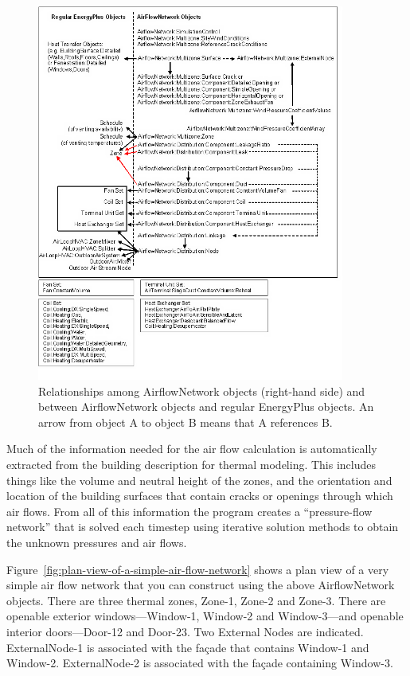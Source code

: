 \begin{figure}[hbtp] %
\centering
\includegraphics[width=0.9\textwidth, height=0.9\textheight, keepaspectratio=true]{media/image215.png}
\caption{Relationships among AirflowNetwork objects (right-hand side) and between AirflowNetwork objects and regular EnergyPlus objects. An arrow from object A to object B means that A references B. \protect \label{fig:relationships-among-airflownetwork-objects}}
\end{figure}

Much of the information needed for the air flow calculation is automatically extracted from the building description for thermal modeling. This includes things like the volume and neutral height of the zones, and the orientation and location of the building surfaces that contain cracks or openings through which air flows. From all of this information the program creates a ``pressure-flow network'' that is solved each timestep using iterative solution methods to obtain the unknown pressures and air flows.

Figure~\ref{fig:plan-view-of-a-simple-air-flow-network} shows a plan view of a very simple air flow network that you can construct using the above AirflowNetwork objects. There are three thermal zones, Zone-1, Zone-2 and Zone-3. There are openable exterior windows---Window-1, Window-2 and Window-3---and openable interior doors---Door-12 and Door-23. Two External Nodes are indicated. ExternalNode-1 is associated with the fa\c{c}ade that contains Window-1 and Window-2. ExternalNode-2 is associated with the fa\c{c}ade containing Window-3.

